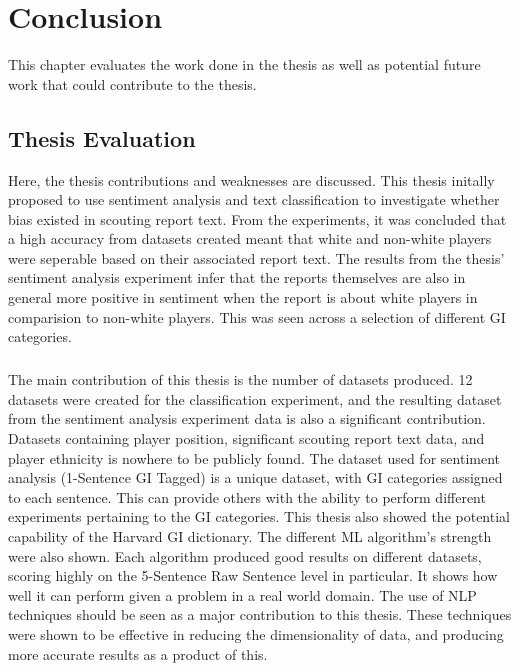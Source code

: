 \documentclass[oneside,12pt]{Classes/RoboticsLaTeX}
\begin{document}
\chapter{Conclusion}
\label{chap:conclusion}
This chapter evaluates the work done in the thesis as well as potential future work that could contribute to the thesis.
\section{Thesis Evaluation}
Here, the thesis contributions and weaknesses are discussed. This thesis initally proposed to use sentiment analysis and text classification to investigate whether bias existed in scouting report text. From the experiments,
it was concluded that a high accuracy from datasets created meant that white and non-white players were seperable based on their associated report text. The results from the thesis' sentiment analysis experiment infer that 
the reports themselves are also in general more positive in sentiment when the report is about white players in comparision to non-white players. This was seen across a selection of different GI categories.

\paragraph{}
The main contribution of this thesis is the number of datasets produced. 12 datasets were created for the classification experiment, and the resulting dataset from the sentiment analysis experiment data is also a significant contribution.
Datasets containing player position, significant scouting report text data, and player ethnicity is nowhere to be publicly found. The dataset used for sentiment analysis (1-Sentence GI Tagged) is a unique dataset, with GI categories assigned
to each sentence. This can provide others with the ability to perform different experiments pertaining to the GI categories. This thesis also showed the potential capability of the Harvard GI dictionary. The different ML algorithm's strength 
were also shown. Each algorithm produced good results on different datasets, scoring highly on the 5-Sentence Raw Sentence level in particular. It shows how well it can perform given a problem in a real world domain. The use of NLP techniques
should be seen as a major contribution to this thesis. These techniques were shown to be effective in reducing the dimensionality of data, and producing more accurate results as a product of this.
\end{document}
